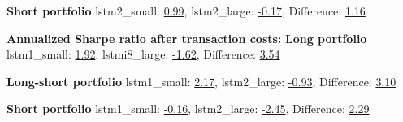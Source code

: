 \indent\newline
\textbf{Short portfolio} 
\indent\newline
lstm2\_small: \underline{0.99},  lstm2\_large: \underline{-0.17},  Difference: \underline{1.16} 

\indent\newline
\indent\newline
\textbf{Annualized Sharpe ratio after transaction costs:}
\indent\newline
\textbf{Long portfolio} 
\indent\newline
lstm1\_small: \underline{1.92},  lstmi8\_large: \underline{-1.62},  Difference: \underline{3.54}

\indent\newline
\textbf{Long-short portfolio}
\indent\newline
lstm1\_small: \underline{2.17},  lstm2\_large: \underline{-0.93},  Difference: \underline{3.10} 
  
\indent\newline
\textbf{Short portfolio} 
\indent\newline
lstm1\_small: \underline{-0.16},  lstm2\_large: \underline{-2.45},  Difference: \underline{2.29}  